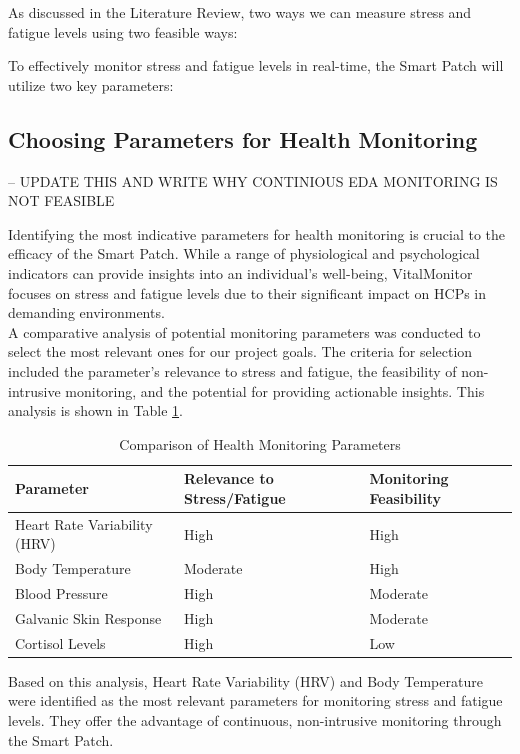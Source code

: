 As discussed in the Literature Review, two ways we can measure stress and fatigue levels using two feasible ways: 

To effectively monitor stress and fatigue levels in real-time, the Smart Patch will utilize two key parameters:\\

\subsection{Choosing Parameters for Health Monitoring} -- UPDATE THIS AND WRITE WHY CONTINIOUS EDA MONITORING IS NOT FEASIBLE

Identifying the most indicative parameters for health monitoring is crucial to the efficacy of the Smart Patch. While a range of physiological and psychological indicators can provide insights into an individual's well-being, VitalMonitor focuses on stress and fatigue levels due to their significant impact on HCPs in demanding environments. \cite{43} \cite{42} \\

\noindent A comparative analysis of potential monitoring parameters was conducted to select the most relevant ones for our project goals. The criteria for selection included the parameter’s relevance to stress and fatigue, the feasibility of non-intrusive monitoring, and the potential for providing actionable insights. This analysis is shown in Table \ref{tab:health_parameters}.\\

\begin{table}[h]
\centering 
\begin{tabularx}{\textwidth}{|X|X|X|}
\hline \textbf{Parameter} & \textbf{Relevance to Stress/Fatigue} & \textbf{Monitoring Feasibility} \\ 
\hline Heart Rate Variability (HRV) & High & High \\ 
\hline Body Temperature & Moderate & High \\
\hline Blood Pressure & High & Moderate \\ 
\hline Galvanic Skin Response & High & Moderate \\ 
\hline Cortisol Levels & High & Low \\  \hline
\end{tabularx} 
\caption{Comparison of Health Monitoring Parameters} \label{tab:health_parameters} 
\end{table}

\noindent Based on this analysis, Heart Rate Variability (HRV) and Body Temperature were identified as the most relevant parameters for monitoring stress and fatigue levels. They offer the advantage of continuous, non-intrusive monitoring through the Smart Patch.\\

